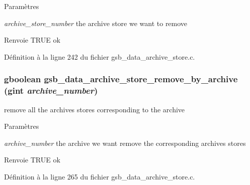 \begin{DoxyParams}{Paramètres}
\item[{\em archive\_\-store\_\-number}]the archive store we want to remove\end{DoxyParams}
\begin{DoxyReturn}{Renvoie}
TRUE ok 
\end{DoxyReturn}


Définition à la ligne 242 du fichier gsb\_\-data\_\-archive\_\-store.c.

\subsubsection[{gsb\_\-data\_\-archive\_\-store\_\-remove\_\-by\_\-archive}]{\setlength{\rightskip}{0pt plus 5cm}gboolean gsb\_\-data\_\-archive\_\-store\_\-remove\_\-by\_\-archive (gint {\em archive\_\-number})}\label{gsb__data__archive__store_8h_a27c1f783d9b3538226a3dd233af1a154}
remove all the archives stores corresponding to the archive


\begin{DoxyParams}{Paramètres}
\item[{\em archive\_\-number}]the archive we want remove the corresponding archives stores\end{DoxyParams}
\begin{DoxyReturn}{Renvoie}
TRUE ok 
\end{DoxyReturn}


Définition à la ligne 265 du fichier gsb\_\-data\_\-archive\_\-store.c.

